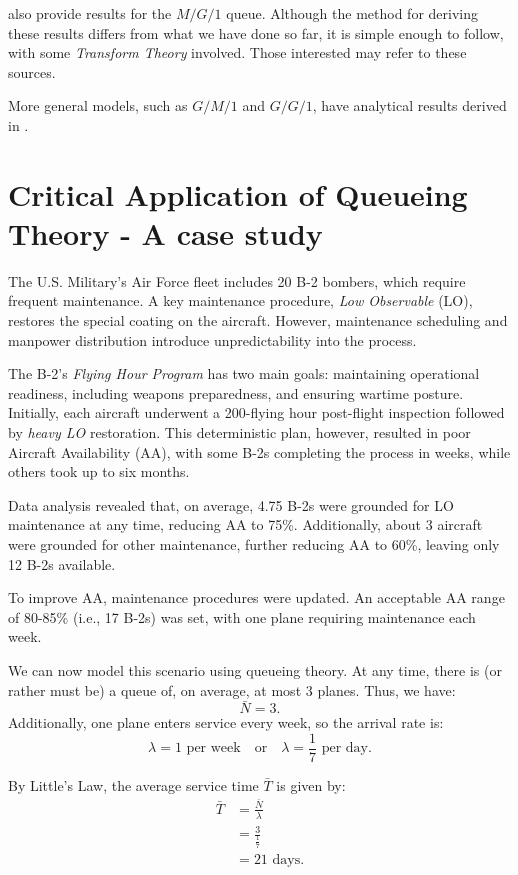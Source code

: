 \documentclass[11pt, a4paper]{report}
\begin{document}
\cite{RobertazziQ,myReference} also provide results for the $M/G/1$ queue. Although the method for deriving these results differs from what we have done so far, it is simple enough to follow, with some \emph{Transform Theory} involved. Those interested may refer to these sources.

More general models, such as $G/M/1$ and $G/G/1$, have analytical results derived in \cite{10.1214/aoms/1177728975,kleinrock1974queueing}.

\section{Critical Application of Queueing Theory - A case study}
The U.S. Military’s Air Force fleet includes 20 B-2 bombers, which require frequent maintenance. A key maintenance procedure, \emph{Low Observable} (LO), restores the special coating on the aircraft. However, maintenance scheduling and manpower distribution introduce unpredictability into the process.

The B-2’s \emph{Flying Hour Program} has two main goals: maintaining operational readiness, including weapons preparedness, and ensuring wartime posture. Initially, each aircraft underwent a 200-flying hour post-flight inspection followed by \emph{heavy LO} restoration. This deterministic plan, however, resulted in poor Aircraft Availability (AA), with some B-2s completing the process in weeks, while others took up to six months.

Data analysis revealed that, on average, 4.75 B-2s were grounded for LO maintenance at any time, reducing AA to 75\%. Additionally, about 3 aircraft were grounded for other maintenance, further reducing AA to 60\%, leaving only 12 B-2s available.

To improve AA, maintenance procedures were updated. An acceptable AA range of 80-85\% (i.e., 17 B-2s) was set, with one plane requiring maintenance each week.


We can now model this scenario using queueing theory. At any time, there is (or rather must be) a queue of, on average, at most 3 planes. Thus, we have:
\[
\bar{N} = 3.
\]
Additionally, one plane enters service every week, so the arrival rate is:
\[
\lambda = 1 \text{ per week} \quad \text{or} \quad \lambda = \frac{1}{7} \text{ per day}.
\]

By Little's Law, the average service time \(\bar{T}\) is given by:
\begin{align}
    \bar{T} &= \frac{\bar{N}}{\lambda} \\
    &= \frac{3}{\frac{1}{7}} \\
    &= 21 \text{ days}.
\end{align}
\end{document}
